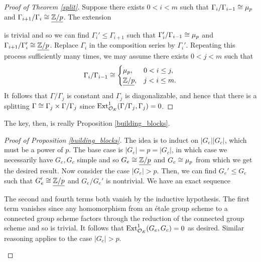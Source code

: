\documentclass[11pt]{article}
\begin{document}
\begin{proof}[Proof of Theorem \ref{split}]
Suppose there exists $0<i<m$ such that $\Gamma_i/\Gamma_{i-1}\cong\mu_p$ and $\Gamma_{i+1}/\Gamma_i\cong\underline{\mathbb{Z}/p}$. The extension
\begin{center}
\end{center}
is trivial and so we can find $\Gamma_i'\leq\Gamma_{i+1}$ such that $\Gamma_i'/\Gamma_{i-1}\cong\mu_p$ and $\Gamma_{i+1}/\Gamma_i'\cong\underline{\mathbb{Z}/p}$. Replace $\Gamma_i$ in the composition series by $\Gamma_i'$. Repeating this process sufficiently many times, we may assume there exists $0<j<m$ such that 
\begin{equation*}
\Gamma_i/\Gamma_{i-1}\cong
\begin{cases}
\mu_p, & 0<i\leq j, \\
\underline{\mathbb{Z}/p}, & j<i\leq m.
\end{cases}
\end{equation*}
It follows that $\Gamma/\Gamma_j$ is constant and $\Gamma_j$ is diagonalizable, and hence that there is a splitting $\Gamma\cong\Gamma_j\times\Gamma/\Gamma_j$ since $\operatorname{Ext}_{\mathcal{O}_E}^1(\Gamma/\Gamma_j,\Gamma_j)=0$.
\end{proof}

The key, then, is really Proposition \ref{building_blocks}. 

\begin{proof}[Proof of Proposition \ref{building_blocks}]
The idea is to induct on $|G_e||G_c|$, which must be a power of $p$. The base case is $|G_e|=p=|G_c|$, in which case we necessarily have $G_e,G_c$ simple and so $G_e\cong\underline{\mathbb{Z}/p}$ and $G_c\cong\mu_p$ from which we get the desired result. Now consider the case $|G_e|>p$. Then, we can find $G_e'\leq G_e$ such that $G_e'\cong\underline{\mathbb{Z}/p}$ and $G_e/G_e'$ is nontrivial. We have an exact sequence
\begin{center}
\end{center}
The second and fourth terms both vanish by the inductive hypothesis. The first term vanishes since any homomorphism from an \'{e}tale group scheme to a connected group scheme factors through the reduction of the connected group scheme and so is trivial. It follows that $\operatorname{Ext}_{\mathcal{O}_E}^1(G_e,G_c)=0$ as desired. Similar reasoning applies to the case $|G_c|>p$.
\begin{enum}{\alph}
\item 

\item 

\item 
\end{enum}
\end{proof}
\end{document}
